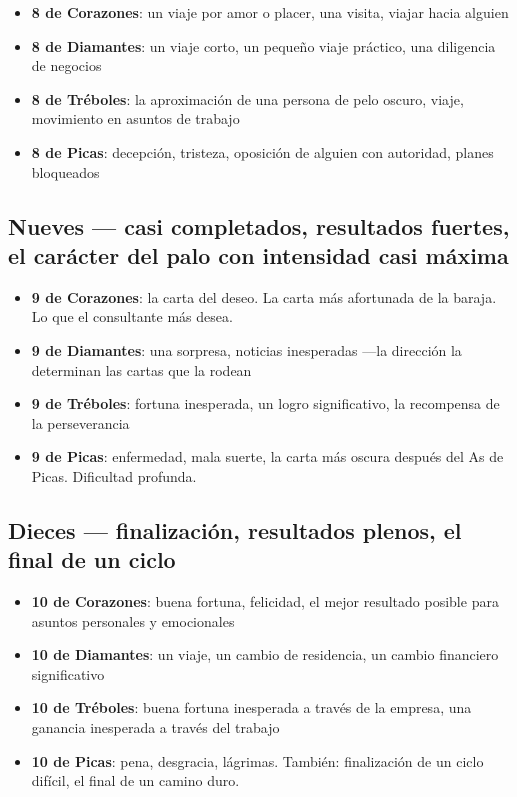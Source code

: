 \begin{itemize}
\tightlist
\item
  \textbf{8 de Corazones}: un viaje por amor o placer, una visita, viajar hacia alguien
\item
  \textbf{8 de Diamantes}: un viaje corto, un pequeño viaje práctico, una diligencia de negocios
\item
  \textbf{8 de Tréboles}: la aproximación de una persona de pelo oscuro, viaje, movimiento en asuntos de trabajo
\item
  \textbf{8 de Picas}: decepción, tristeza, oposición de alguien con autoridad, planes bloqueados
\end{itemize}

\subsection{Nueves --- casi completados, resultados fuertes, el carácter del palo con intensidad casi máxima}\label{nines--near-completion-strong-outcomes-the-suit-character-at-near-maximum-intensity}

\begin{itemize}
\tightlist
\item
  \textbf{9 de Corazones}: la carta del deseo. La carta más afortunada de la baraja. Lo que el consultante más desea.
\item
  \textbf{9 de Diamantes}: una sorpresa, noticias inesperadas ---la dirección la determinan las cartas que la rodean
\item
  \textbf{9 de Tréboles}: fortuna inesperada, un logro significativo, la recompensa de la perseverancia
\item
  \textbf{9 de Picas}: enfermedad, mala suerte, la carta más oscura después del As de Picas. Dificultad profunda.
\end{itemize}

\subsection{Dieces --- finalización, resultados plenos, el final de un ciclo}\label{tens--completion-full-outcomes-the-end-of-a-cycle}

\begin{itemize}
\tightlist
\item
  \textbf{10 de Corazones}: buena fortuna, felicidad, el mejor resultado posible para asuntos personales y emocionales
\item
  \textbf{10 de Diamantes}: un viaje, un cambio de residencia, un cambio financiero significativo
\item
  \textbf{10 de Tréboles}: buena fortuna inesperada a través de la empresa, una ganancia inesperada a través del trabajo
\item
  \textbf{10 de Picas}: pena, desgracia, lágrimas. También: finalización de un ciclo difícil, el final de un camino duro.
\end{itemize}

